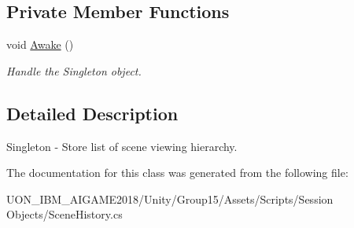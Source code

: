 \subsection*{Private Member Functions}
\begin{DoxyCompactItemize}
\item 
\mbox{\label{class_scene_history_a514f50fbc863e0b0e3b93dbf88a40703}} 
void \mbox{\hyperlink{class_scene_history_a514f50fbc863e0b0e3b93dbf88a40703}{Awake}} ()
\begin{DoxyCompactList}\small\item\em Handle the Singleton object. \end{DoxyCompactList}\end{DoxyCompactItemize}


\subsection{Detailed Description}
Singleton -\/ Store list of scene viewing hierarchy. 

The documentation for this class was generated from the following file\+:\begin{DoxyCompactItemize}
\item 
U\+O\+N\+\_\+\+I\+B\+M\+\_\+\+A\+I\+G\+A\+M\+E2018/\+Unity/\+Group15/\+Assets/\+Scripts/\+Session Objects/Scene\+History.\+cs\end{DoxyCompactItemize}
